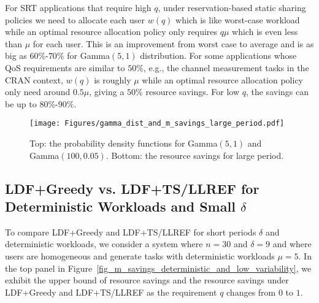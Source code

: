 \documentclass[prodmode,acmtompecs]{acmsmall}
\newcommand{\reqscalar}{q}
\newcommand{\myComments}[1]{}
\newif\ifdissertation
\newcommand{\dissertationStart}{\ifdissertation  \myComments{Dissertation version: }}
\newcommand{\commentEnd}{\myComments{End}}
\begin{document}
For SRT applications that require high $\reqscalar$, under reservation-based static sharing policies we need to allocate each user $w(q)$ which is like worst-case workload while an optimal resource allocation policy only requires $q\mu$ which is even less than $\mu$ for each user. This is an improvement from worst case to average and is as big as $60\%$-$70\%$ for Gamma$(5,1)$ distribution. 
For some applications whose QoS requirements are similar to $50\%$, e.g., the channel measurement tasks in the CRAN context, $w(q)$ is roughly $\mu$ while an optimal resource allocation policy only need around $0.5\mu$, giving a $50\%$ resource savings. 
For low $\reqscalar$, the savings can be up to $80\%$-$90\%$. 
\commentEnd\fi



\begin{figure}[htp]
  \centering
  \texttt{[image: Figures/gamma\_dist\_and\_m\_savings\_large\_period.pdf]}
\caption{Top: the probability density functions for Gamma$(5, 1)$ and Gamma$(100, 0.05)$. Bottom: the resource savings for large period.}
  \label{fig_gamma_dist_and_m_savings_large_period}
\end{figure}


\subsection{LDF+Greedy vs. LDF+TS/LLREF for Deterministic Workloads and Small $\delta$} 
\dissertationStart
When period $\delta$ is comparable to mean workloads, we shall explore other resource allocation policies. 

For the SRT-MIC system model where users have the same $\reqscalar$ and generate tasks with the same deterministic workloads, by (\ref{align_m_savings_simplified}) we know $w(q)$ equals to $\mu$ and thus we get
$$
1 - \frac{\underline{m}}{m_{\text{RB}}} \simeq 1 - q. 
$$

This implies that the resource savings monotonically decrease as $q$ increases, which is different from the ``U'' shape of the lines in Figure~{\ref{fig_gamma_dist_and_m_savings_large_period}}. By Theorem \ref{thm_LDF_TS_LLREF_eff_ratio} the LDF+TS/LLREF policy provides a good option to achieve these savings. 
\commentEnd\fi

To compare LDF+Greedy and LDF+TS/LLREF for short periods $\delta$ and deterministic workloads, we consider a system where $n = 30$ and $\delta = 9$ and where users are homogeneous and generate tasks with deterministic workloads $\mu = 5$. 
In the top panel in Figure~{\ref{fig_m_savings_deterministic_and_low_variability}}, we exhibit the upper bound of resource savings and the resource savings under LDF+Greedy and LDF+TS/LLREF as the requirement $q$ changes from $0$ to $1$. 
\end{document}
